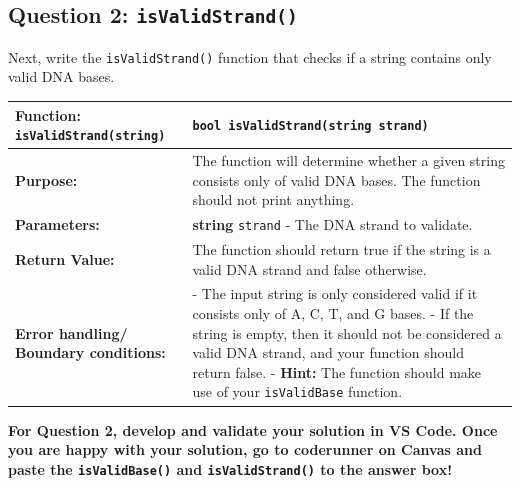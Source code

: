 \subsection{Question 2: \texttt{isValidStrand()}}

Next, write the \texttt{isValidStrand()} function that checks if a string contains only valid DNA bases.

\begin{longtable}{|p{1.7in}|p{4.0in}|}
    \hline
    \textbf{Function:} \texttt{isValidStrand(string)}
        & 
        \texttt{bool isValidStrand(string strand)} 
        \\ \hline
    
    \textbf{Purpose:} 
        & 
        The function will determine whether a given string consists only of valid DNA bases. The function should not print anything.
        \\ \hline
    
    \textbf{Parameters:} 
        & 
        \textbf{string} \texttt{strand} - The DNA strand to validate. 
        \\ \hline
    
    \textbf{Return Value:} 
        & 
        The function should return true if the string is a valid DNA strand and false otherwise.
        \\ \hline
    \textbf{Error handling/ Boundary conditions:}
        &
        - The input string is only considered valid if it consists only of A, C, T, and G bases. \newline
        - If the string is empty, then it should not be considered a valid DNA strand, and your function should return false. \newline
        - \textbf{Hint:} The function should make use of your \texttt{isValidBase} function.
        \\ \hline
\end{longtable}

\textbf{For Question 2, develop and validate your solution in VS Code. Once you are happy with your solution, go to coderunner on Canvas and paste the \texttt{isValidBase()} and \texttt{isValidStrand()} to the answer box!} 

